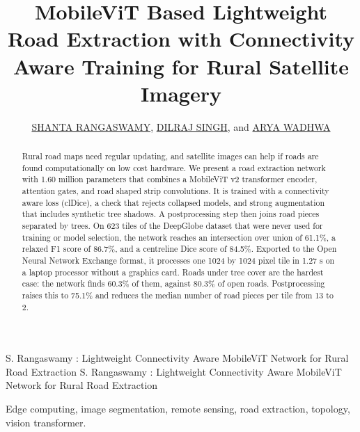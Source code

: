 \documentclass{ieeeaccess}
\begin{document}

\title{MobileViT Based Lightweight Road Extraction with Connectivity Aware Training for Rural Satellite Imagery}

\author{\href{https://orcid.org/0000-0000-0000-0000}{\uppercase{Shanta Rangaswamy}},
\href{https://orcid.org/0009-0001-2697-3893}{\uppercase{Dilraj Singh}}, and
\href{https://orcid.org/0009-0008-9654-4008}{\uppercase{Arya Wadhwa}}}

\address[1]{Department of Computer Science and Engineering, RV College of Engineering, Bengaluru 560059, India (e-mail: dilrajsingh.ai24@rvce.edu.in; aryawadhwa.ai24@rvce.edu.in; shantharangaswamy@rvce.edu.in)}

\markboth
{S. Rangaswamy \headeretal: Lightweight Connectivity Aware MobileViT Network for Rural Road Extraction}
{S. Rangaswamy \headeretal: Lightweight Connectivity Aware MobileViT Network for Rural Road Extraction}


\begin{abstract}
Rural road maps need regular updating, and satellite images can help if roads are found computationally on low cost hardware. We present a road extraction network with 1.60 million parameters that combines a MobileViT v2 transformer encoder, attention gates, and road shaped strip convolutions. It is trained with a connectivity aware loss (clDice), a check that rejects collapsed models, and strong augmentation that includes synthetic tree shadows. A postprocessing step then joins road pieces separated by trees. On 623 tiles of the DeepGlobe dataset that were never used for training or model selection, the network reaches an intersection over union of 61.1\%, a relaxed F1 score of 86.7\%, and a centreline Dice score of 84.5\%. Exported to the Open Neural Network Exchange format, it processes one 1024 by 1024 pixel tile in 1.27 s on a laptop processor without a graphics card. Roads under tree cover are the hardest case: the network finds 60.3\% of them, against 80.3\% of open roads. Postprocessing raises this to 75.1\% and reduces the median number of road pieces per tile from 13 to 2.
\end{abstract}

\begin{keywords}
Edge computing, image segmentation, remote sensing, road extraction, topology, vision transformer.
\end{keywords}
\end{document}
